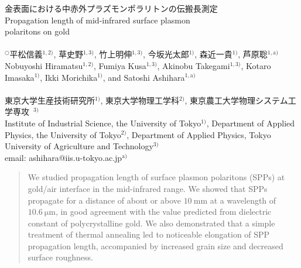 \documentclass[a4,10truept]{jsarticle}
\begin{document}
\hspace{35truemm} \begin{minipage}{127truemm}
{\fontsize{14truept}{0truept} \selectfont \gt 金表面における中赤外プラズモンポラリトンの伝搬長測定\\ \rm Propagation length of mid-infrared surface plasmon\\ polaritons on gold\\ }\vspace{-0.5em}
{\fontsize{10truept}{0truept} \selectfont \mc \\ $^\bigcirc\!$平松信義$\!^{1,2)}$, 草史野$\!^{1,3)}$, 竹上明伸$\!^{1,3)}$, 今坂光太郎$\!^{1)}$, 森近一貴$\!^{1)}$, 芦原聡$\!^{1,\mathrm{a})}$\\ \rm Nobuyoshi Hiramatsu$^{1,2)}$, Fumiya Kusa$^{1,3)}$, Akinobu Takegami$^{1,3)}$, Kotaro Imasaka$^{1)}$, Ikki Morichika$^{1)}$, and Satoshi Ashihara$^{1,\mathrm{a})}$\\}\vspace{-0.7em}
{\fontsize{9.7truept}{0truept} \selectfont \mc \\ 東京大学生産技術研究所$\!^{1)}$, 東京大学物理工学科$\!^{2)}$, 東京農工大学物理システム工学専攻~$\!^{3)}$\\ \rm
Institute of Industrial Science, the University of Tokyo$^{1)}$, Department of Applied Physics, the University of Tokyo$^{2)}$, Department of Applied Physics, Tokyo University of Agriculture and Technology$^{3)}$\\
email: ashihara@iis.u-tokyo.ac.jp$^{\mathrm{a})}$\\
}
\end{minipage}

\vspace{-0.3em}
\begin{abstract}
{\fontsize{10pt}{0pt} \rm We studied propagation length of surface plasmon polaritons (SPPs) at gold/air interface in the mid-infrared range. We showed that SPPs propagate for a distance of about or above $10\:\mathrm{mm}$ at a wavelength of $10.6\:\mathrm{\mu m}$, in good agreement with the value predicted from dielectric constant of polycrystalline gold. We also demonstrated that a simple treatment of thermal annealing led to noticeable elongation of SPP propagation length, accompanied by increased grain size and decreased surface roughness.}
\end{abstract}

\vspace{-0.7em}
\end{document}
